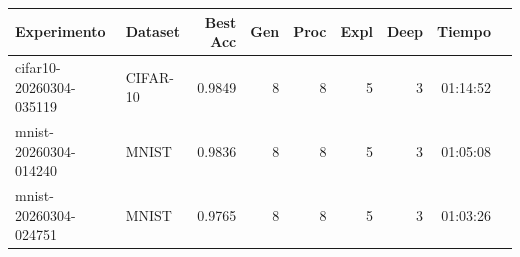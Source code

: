 \begin{tabular}{llrrrrrrr}
\toprule
Experimento & Dataset & Best Acc & Gen & Proc & Expl & Deep & Tiempo \\
\midrule
cifar10-20260304-035119 & CIFAR-10 & 0.9849 & 8 & 8 & 5 & 3 & 01:14:52 \\
mnist-20260304-014240 & MNIST & 0.9836 & 8 & 8 & 5 & 3 & 01:05:08 \\
mnist-20260304-024751 & MNIST & 0.9765 & 8 & 8 & 5 & 3 & 01:03:26 \\
\bottomrule
\end{tabular}